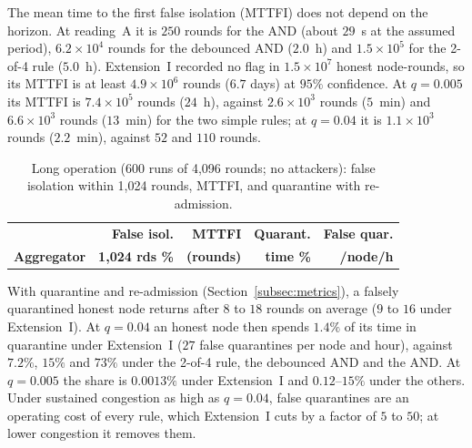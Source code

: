 The mean time to the first false isolation (MTTFI) does not depend on
the horizon.  At reading~A it is $250$ rounds for the AND (about
$29$~s at the assumed period), $6.2\times10^{4}$ rounds for the
debounced AND ($2.0$~h) and $1.5\times10^{5}$ for the 2-of-4 rule
($5.0$~h).  Extension~I recorded no flag in $1.5\times10^{7}$ honest
node-rounds, so its MTTFI is at least $4.9\times10^{6}$ rounds ($6.7$
days) at $95\%$ confidence.  At $q=0.005$ its MTTFI is
$7.4\times10^{5}$ rounds ($24$~h), against $2.6\times10^{3}$ rounds
($5$~min) and $6.6\times10^{3}$ rounds ($13$~min) for the two simple
rules; at $q=0.04$ it is $1.1\times10^{3}$ rounds ($2.2$~min), against
$52$ and $110$ rounds.

\begin{table}[!t]
\caption{Long operation (600 runs of 4{,}096 rounds; no attackers): false isolation within 1{,}024 rounds, MTTFI, and quarantine with re-admission.}
\label{tab:long}
\centering
\renewcommand{\arraystretch}{1.08}
\footnotesize
\setlength{\tabcolsep}{2.4pt}
\begin{tabular}{lrrrr}
\toprule
 & \textbf{False isol.} & \textbf{MTTFI} & \textbf{Quarant.} & \textbf{False quar.} \\
\textbf{Aggregator} & \textbf{1{,}024 rds \%} & \textbf{(rounds)} & \textbf{time \%} & \textbf{/node/h} \\
\midrule
\bottomrule
\end{tabular}
\end{table}

With quarantine and re-admission (Section~\ref{subsec:metrics}), a
falsely quarantined honest node returns after $8$ to $18$ rounds on
average ($9$ to $16$ under Extension~I).  At $q=0.04$ an honest node
then spends $1.4\%$ of its time in quarantine under Extension~I ($27$
false quarantines per node and hour), against $7.2\%$, $15\%$ and $73\%$
under the 2-of-4 rule, the debounced AND and the AND.  At $q=0.005$ the
share is $0.0013\%$ under Extension~I and $0.12$--$15\%$ under the
others.  Under sustained congestion as high as $q=0.04$, false
quarantines are an operating cost of every rule, which Extension~I cuts
by a factor of $5$ to $50$; at lower congestion it removes them.

